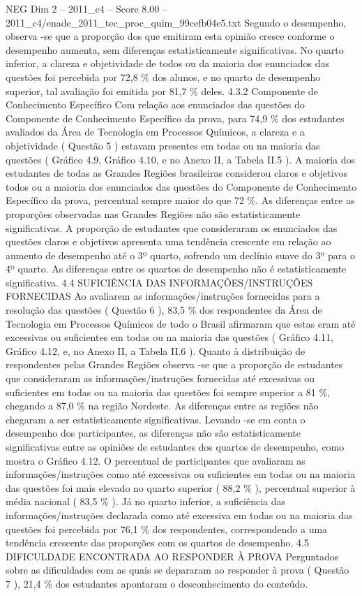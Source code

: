 \begin{textsample}{NEG Dim 2 – 2011\_c4 – Score 8.00 – 2011\_c4/enade\_2011\_tec\_proc\_quim\_99cefb04e5.txt}
Segundo o desempenho, observa -se que a proporção dos que emitiram esta opinião cresce conforme o desempenho aumenta, sem diferenças estatisticamente significativas.
No quarto inferior, a clareza e objetividade de todos ou da maioria dos enunciados das questões foi percebida por 72,8 \% dos alunos, e no quarto de desempenho superior, tal avaliação foi emitida por 81,7 \% deles. 4.3.2 Componente de Conhecimento Específico Com relação aos enunciados das questões do Componente de Conhecimento Específico da prova, para 74,9 \% dos estudantes avaliados da Área de Tecnologia em Processos Químicos, a clareza e a objetividade ( Questão 5 ) estavam presentes em todas ou na maioria das questões ( Gráfico 4.9, Gráfico 4.10, e no Anexo II, a Tabela II.5 ).
A maioria dos estudantes de todas as Grandes Regiões brasileiras considerou claros e objetivos todos ou a maioria dos enunciados das questões do Componente de Conhecimento Específico da prova, percentual sempre maior do que 72 \%.
As diferenças entre as proporções observadas nas Grandes Regiões não são estatisticamente significativas.
A proporção de estudantes que consideraram os enunciados das questões claros e objetivos apresenta uma tendência crescente em relação ao aumento de desempenho até o 3º quarto, sofrendo um declínio suave do 3º para o 4º quarto.
As diferenças entre os quartos de desempenho não é estatisticamente significativa. 4.4 SUFICIÊNCIA DAS INFORMAÇÕES/INSTRUÇÕES FORNECIDAS Ao avaliarem as informações/instruções fornecidas para a resolução das questões ( Questão 6 ), 83,5 \% dos respondentes da Área de Tecnologia em Processos Químicos de todo o Brasil afirmaram que estas eram até excessivas ou suficientes em todas ou na maioria das questões ( Gráfico 4.11, Gráfico 4.12, e, no Anexo II, a Tabela II.6 ).
Quanto à distribuição de respondentes pelas Grandes Regiões observa -se que a proporção de estudantes que consideraram as informações/instruções fornecidas até excessivas ou suficientes em todas ou na maioria das questões foi sempre superior a 81 \%, chegando a 87,0 \% na região Nordeste.
As diferenças entre as regiões não chegaram a ser estatisticamente significativas.
Levando -se em conta o desempenho dos participantes, as diferenças não são estatisticamente significativas entre as opiniões de estudantes dos quartos de desempenho, como mostra o Gráfico 4.12.
O percentual de participantes que avaliaram as informações/instruções como até excessivas ou suficientes em todas ou na maioria das questões foi mais elevado no quarto superior ( 88,2 \% ), percentual superior à média nacional ( 83,5 \% ).
Já no quarto inferior, a suficiência das informações/instruções declarada como até excessiva em todas ou na maioria das questões foi percebida por 76,1 \% dos respondentes, correspondendo a uma tendência crescente das proporções com os quartos de desempenho. 4.5 DIFICULDADE ENCONTRADA AO RESPONDER À PROVA Perguntados sobre as dificuldades com as quais se depararam ao responder à prova ( Questão 7 ), 21,4 \% dos estudantes apontaram o desconhecimento do conteúdo.

\end{textsample}
